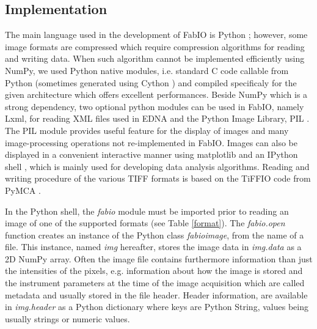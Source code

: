 \documentclass[preprint ]{iucr}
\begin{document}
\subsection{Implementation}
The main language used in the development of FabIO is Python \cite{python};
however, some image formats are compressed which require
compression algorithms for reading and writing data. When such algorithm cannot
be implemented efficiently using NumPy, we used Python native modules, i.e.
standard C code callable from Python (sometimes generated using Cython
\cite{cython}) and compiled specificaly for the given architecture which
offers excellent performances.
Beside NumPy which is a strong dependency, two optional python
modules can be used in FabIO, namely Lxml, for reading XML files used in EDNA
and the Python Image Library, PIL \cite{pil}.
The PIL module provides useful feature for the display of images and many
image-processing operations not re-implemented in FabIO.
% 
Images can also be displayed in a convenient interactive manner using
matplotlib \cite{matplotlib} and an IPython shell \cite{ipython}, which is
mainly used for developing data analysis algorithms.
Reading and writing procedure of the various TIFF \cite{tiff} formats is based
on the TiFFIO code from PyMCA \cite{pymca}.

In the Python shell, the {\em fabio} module must be imported prior to reading an
image of one of the supported formats (see Table \ref{format}).
The {\em fabio.open} function creates an instance of the Python class {\em fabioimage},
from the name of a file. This instance, named {\em img} hereafter, stores the
image data in {\em img.data} as a 2D NumPy array. Often the image file contains
furthermore information than just the intensities of the pixels, e.g.
information about how the image is stored and the instrument parameters at the
time of the image acquisition which  are called metadata and usually stored in
the file header.
Header information, are available in {\em img.header} as a Python
dictionary where keys are Python String, values being usually strings or
numeric values.
\end{document}
